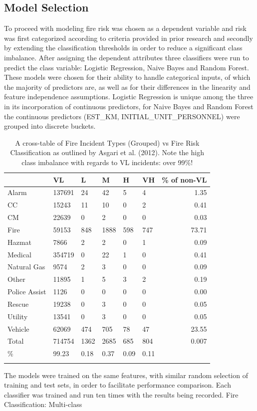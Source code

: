 \documentclass[12pt,letterpaper, oneside]
{article}
\begin{document}
\subsection{Model Selection}
To proceed with modeling fire risk was chosen as a dependent variable and risk was first categorized according to criteria provided in prior research and secondly by extending the classification thresholds in order to reduce a significant class imbalance. After assigning the dependent attributes three classifiers were run to predict the class variable: Logistic Regression, Naive Bayes and Random Forest.   These models were chosen for their ability to handle categorical inputs, of which the majority of predictors are, as well as for their differences in the linearity and feature independence assumptions. Logistic Regression is unique among the three in its incorporation of continuous predictors, for Naive Bayes and Random Forest the continuous predictors (EST\_KM, INITIAL\_UNIT\_PERSONNEL) were grouped into discrete buckets. 

\begin{table}
	\begin{tabular}{l l l l l l r}\toprule
		& VL & L & M & H & VH & \% of non-VL \\ \midrule
	Alarm & 137691 & 24 & 42 & 5 & 4 & 1.35 \\
	CC & 15243 & 11 & 10 & 0 & 2 & 0.41 \\
	CM & 22639 & 0 & 2 & 0 & 0 & 0.03 \\
	Fire & 59153 & 848 & 1888 & 598 & 747 & 73.71 \\
	Hazmat & 7866 & 2 & 2 & 0 & 1 & 0.09 \\
	Medical & 354719 & 0 & 22 & 1 & 0 & 0.41 \\
	Natural Gas & 9574 & 2 & 3 & 0 & 0 & 0.09 \\
	Other & 11895 & 1 & 5 & 3 & 2 & 0.19 \\
	Police Assist & 1126 & 0 & 0 & 0 & 0 & 0.00 \\
	Rescue & 19238 & 0 & 3 & 0 & 0 & 0.05 \\
	Utility & 13541 & 0 & 3 & 0 & 0 & 0.05 \\
	Vehicle & 62069 & 474 & 705 & 78 & 47 & 23.55 \\
	Total & 714754 & 1362 & 2685 & 685 & 804 & 0.007 \\ \midrule
	\% & 99.23 & 0.18 & 0.37 & 0.09 & 0.11 & \\  \bottomrule
	\caption{
	A cross-table of Fire Incident Types (Grouped) vs Fire Risk Classification as outlined by Asgari et al. (2012). Note the high class imbalance with regards to VL incidents: over 99\%!
	\label{tab:type-class}
	}


	\end{tabular}
\end{table}
The models were trained on the same features, with similar random selection of training and test sets, in order to facilitate performance comparison. Each classifier was trained and run ten times with the results being recorded. 
Fire Classification: Multi-class
\end{document}

